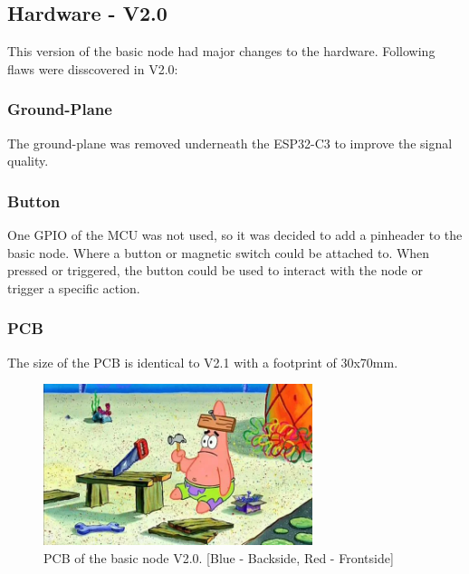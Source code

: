 \subsection{Hardware - V2.0}

    This version of the basic node had major changes to the hardware. Following flaws
    were disscovered in V2.0:

    \subsubsection{Ground-Plane}
        The ground-plane was removed underneath the ESP32-C3 to improve the
        signal quality. 

    \subsubsection{Button}
        One GPIO of the MCU was not used, so it was decided to add a pinheader to the basic node.
        Where a button or magnetic switch could be attached to. When pressed or triggered, the
        button could be used to interact with the node or trigger a specific action.

    \subsubsection{PCB}
        The size of the PCB is identical to V2.1 with a footprint of 30x70mm.
        
    \begin{figure}[H]
        \centering
        \includegraphics[width=0.7\textwidth]{assets/HW/TBD.png}
        \caption{PCB of the basic node V2.0. [Blue - Backside, Red - Frontside]}
    \end{figure}
